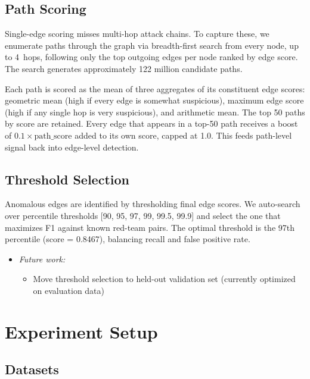 \documentclass[letterpaper,twocolumn,10pt]{article}
\begin{document}
\subsection{Path Scoring}

Single-edge scoring misses multi-hop attack chains. To capture these, we enumerate paths through the graph via breadth-first search from every node, up to 4~hops, following only the top outgoing edges per node ranked by edge score. The search generates approximately 122 million candidate paths.

Each path is scored as the mean of three aggregates of its constituent edge scores: geometric mean (high if every edge is somewhat suspicious), maximum edge score (high if any single hop is very suspicious), and arithmetic mean. The top 50 paths by score are retained. Every edge that appears in a top-50 path receives a boost of $0.1 \times \text{path\_score}$ added to its own score, capped at 1.0. This feeds path-level signal back into edge-level detection.

\subsection{Threshold Selection}

Anomalous edges are identified by thresholding final edge scores. We auto-search over percentile thresholds [90, 95, 97, 99, 99.5, 99.9] and select the one that maximizes F1 against known red-team pairs. The optimal threshold is the 97th percentile (score = 0.8467), balancing recall and false positive rate.

\begin{itemize}
\item \textit{Future work:}
\begin{itemize}
\item Move threshold selection to held-out validation set (currently optimized on evaluation data)
\end{itemize}
\end{itemize}


\section{Experiment Setup}

\subsection{Datasets}
\end{document}
